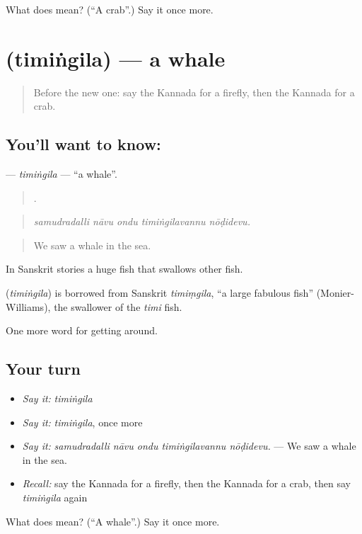 \begin{tcolorbox}[breakable,colback=teal!4,colframe=teal!35!black,title={Before you move on}]
What does  mean? (\textquotedblleft{}A crab\textquotedblright{}.) Say it once more.
\end{tcolorbox}
\section[\texorpdfstring{\kn{ತಿಮಿಂಗಿಲ} (timiṅgila)}{ತಿಮಿಂಗಿಲ (timiṅgila)}]{ (timiṅgila) — a whale}

\label{lesson:KA-C478-timingila}



\begin{quote}
Before the new one: say the Kannada for a firefly, then the Kannada for a crab.
\end{quote}

\subsection*{You'll want to know: }
\textbf{} — \emph{timiṅgila} — \textquotedblleft{}a whale\textquotedblright{}.

\begin{quote}
    .
\end{quote}

\begin{quote}
\emph{samudradalli nāvu ondu timiṅgilavannu nōḍidevu.}
\end{quote}

\begin{quote}
We saw a whale in the sea.
\end{quote}

In Sanskrit stories a huge fish that swallows other fish.

\begin{cousinweb}
\textbf{} (\emph{timiṅgila}) is borrowed from Sanskrit \emph{timiṃgila}, \textquotedblleft{}a large fabulous fish\textquotedblright{} (Monier-Williams), the swallower of the \emph{timi} fish.
\end{cousinweb}

\begin{grammarlens}[title={What you've built}]
One more word for getting around.
\end{grammarlens}

\subsection*{Your turn}
\begin{itemize}
\raggedright
  \item \emph{Say it:} \emph{timiṅgila}
  \item \emph{Say it:} \emph{timiṅgila}, once more
  \item \emph{Say it:} \emph{samudradalli nāvu ondu timiṅgilavannu nōḍidevu.} — We saw a whale in the sea.
  \item \emph{Recall:} say the Kannada for a firefly, then the Kannada for a crab, then say \emph{timiṅgila} again
\end{itemize}

\begin{tcolorbox}[breakable,colback=teal!4,colframe=teal!35!black,title={Before you move on}]
What does  mean? (\textquotedblleft{}A whale\textquotedblright{}.) Say it once more.
\end{tcolorbox}
